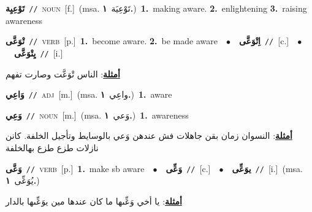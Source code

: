 \documentclass[10pt,a4paper,twoside]{article} %
\begin{document}
\begin{multicols}{2}
{\setlength\topsep{0pt}\textbf{\foreignlanguage{arabic}{تَوْعِيِة}}\ {\color{gray}\texttt{//}\color{black}}\ \textsc{noun}\ [f.]\ \color{gray}(msa. \foreignlanguage{arabic}{تَوْعِيَة}~\foreignlanguage{arabic}{\textbf{١.}})\color{black}\ \textbf{1.}~making aware.  \textbf{2.}~enlightening  \textbf{3.}~raising awareness\ } \vspace{2mm}

{\setlength\topsep{0pt}\textbf{\foreignlanguage{arabic}{تْوَعَّى}}\ {\color{gray}\texttt{//}\color{black}}\ \textsc{verb}\ [p.]\ \textbf{1.}~become aware.  \textbf{2.}~be made aware\ \ $\bullet$\ \ \setlength\topsep{0pt}\textbf{\foreignlanguage{arabic}{اِتْوَعَّى}}\ {\color{gray}\texttt{//}\color{black}}\ [c.]\ \ $\bullet$\ \ \setlength\topsep{0pt}\textbf{\foreignlanguage{arabic}{يِتْوَعَّى}}\ {\color{gray}\texttt{//}\color{black}}\ [i.]\  \begin{flushright}\color{gray}\foreignlanguage{arabic}{\textbf{\underline{\foreignlanguage{arabic}{أمثلة}}}: الناس تْوَعَّت وصارت تفهم}\end{flushright}\color{black}} \vspace{2mm}

{\setlength\topsep{0pt}\textbf{\foreignlanguage{arabic}{وَاعِي}}\ {\color{gray}\texttt{//}\color{black}}\ \textsc{adj}\ [m.]\ \color{gray}(msa. \foreignlanguage{arabic}{واعِي}~\foreignlanguage{arabic}{\textbf{١.}})\color{black}\ \textbf{1.}~aware\ } \vspace{2mm}

{\setlength\topsep{0pt}\textbf{\foreignlanguage{arabic}{وَعِي}}\ {\color{gray}\texttt{//}\color{black}}\ \textsc{noun}\ [m.]\ \color{gray}(msa. \foreignlanguage{arabic}{وَعي}~\foreignlanguage{arabic}{\textbf{١.}})\color{black}\ \textbf{1.}~awareness\  \begin{flushright}\color{gray}\foreignlanguage{arabic}{\textbf{\underline{\foreignlanguage{arabic}{أمثلة}}}: النسوان زمان بقن جاهلات فش عندهن وَعي بالوسايط وتأجيل الخلفة. كانن نازلات طزع طزع بهالخلفة}\end{flushright}\color{black}} \vspace{2mm}

{\setlength\topsep{0pt}\textbf{\foreignlanguage{arabic}{وَعَّى}}\ {\color{gray}\texttt{//}\color{black}}\ \textsc{verb}\ [p.]\ \textbf{1.}~make sb aware\ \ $\bullet$\ \ \setlength\topsep{0pt}\textbf{\foreignlanguage{arabic}{وَعِّى}}\ {\color{gray}\texttt{//}\color{black}}\ [c.]\ \ $\bullet$\ \ \setlength\topsep{0pt}\textbf{\foreignlanguage{arabic}{يوَعِّى}}\ {\color{gray}\texttt{//}\color{black}}\ [i.]\ \color{gray}(msa. \foreignlanguage{arabic}{يُوَعِّى}~\foreignlanguage{arabic}{\textbf{١.}})\color{black}\  \begin{flushright}\color{gray}\foreignlanguage{arabic}{\textbf{\underline{\foreignlanguage{arabic}{أمثلة}}}: يا أخي وَعِّىها ما كان عندها مين يوَعِّىها بالدار}\end{flushright}\color{black}} \vspace{2mm}


\end{multicols}
\end{document}
